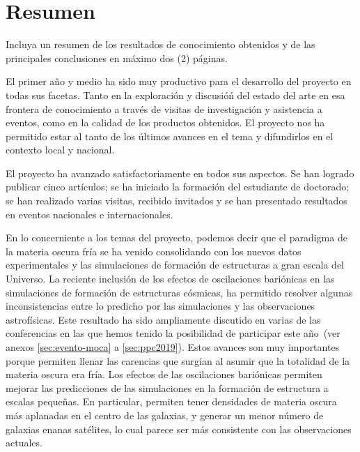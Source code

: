 
\newpage
\section{Resumen }
\begin{instrucciones}
Incluya un resumen de los resultados de conocimiento obtenidos y de las principales conclusiones en máximo dos (2) páginas.
\end{instrucciones}

 

El primer año y medio ha sido muy productivo para el desarrollo del proyecto en
todas sus facetas. Tanto en la exploración y discusióń del estado del
arte en esa frontera de conocimiento a través de visitas de investigación y asistencia a eventos,
como en la
calidad de los productos obtenidos.  El proyecto nos ha permitido
estar al tanto de los últimos avances en el tema y difundirlos en el
contexto local y nacional.

El proyecto ha avanzado satisfactoriamente en todos sus aspectos. Se han logrado publicar cinco artículos; se ha iniciado la formación del estudiante de doctorado; se han realizado varias visitas, recibido invitados y se han presentado resultados en eventos nacionales e internacionales.


En lo concerniente a los temas del proyecto, podemos decir que
el paradigma de la materia oscura fría se
ha venido consolidando con los nuevos datos experimentales y las
simulaciones de formación de estructuras a gran escala del Universo.
La reciente inclusión de
los efectos de oscilaciones bariónicas en las simulaciones de formación
de estructuras cósmicas, ha permitido resolver algunas inconsistencias
entre lo predicho por las simulaciones y las observaciones astrofísicas.
Este resultado ha sido ampliamente discutido en varias de las conferencias
en las que hemos tenido la posibilidad de participar este año~(ver anexos \ref{sec:evento-moca} a
\ref{sec:ppc2019}).
Estos avances son muy importantes porque permiten llenar las carencias que
surgían al asumir que la totalidad de
la materia oscura era fría. Los efectos de
las oscilaciones bariónicas permiten mejorar las predicciones de las simulaciones
en la formación de estructura a escalas pequeñas. En particular, permiten tener densidades de materia oscura más aplanadas en el centro de las galaxias, y
generar un menor número de galaxias enanas satélites, lo cual parece ser más consistente
con las observaciones actuales.

